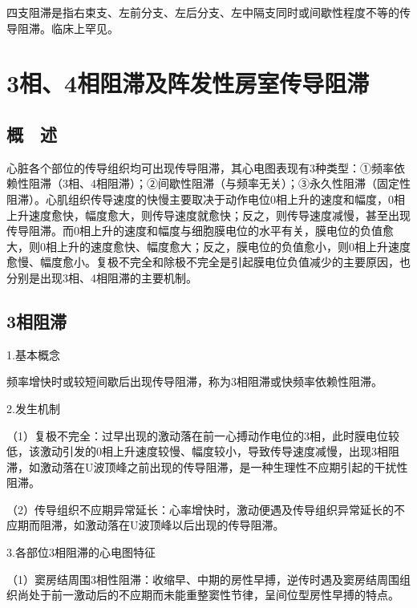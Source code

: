 四支阻滞是指右束支、左前分支、左后分支、左中隔支同时或间歇性程度不等的传导阻滞。临床上罕见。

\protect\hypertarget{text00029.html}{}{}

\protect\hypertarget{text00029.htmlux5cux23chapter29}{}{}

\chapter{3相、4相阻滞及阵发性房室传导阻滞}

\protect\hypertarget{text00029.htmlux5cux23subid355}{}{}

\section{概　述}

心脏各个部位的传导组织均可出现传导阻滞，其心电图表现有3种类型：①频率依赖性阻滞（3相、4相阻滞）；②间歇性阻滞（与频率无关）；③永久性阻滞（固定性阻滞）。心肌组织传导速度的快慢主要取决于动作电位0相上升的速度和幅度，0相上升速度愈快，幅度愈大，则传导速度就愈快；反之，则传导速度减慢，甚至出现传导阻滞。而0相上升的速度和幅度与细胞膜电位的水平有关，膜电位的负值愈大，则0相上升的速度愈快、幅度愈大；反之，膜电位的负值愈小，则0相上升速度愈慢、幅度愈小。复极不完全和除极不完全是引起膜电位负值减少的主要原因，也分别是出现3相、4相阻滞的主要机制。

\protect\hypertarget{text00029.htmlux5cux23subid356}{}{}

\section{3相阻滞}

1.基本概念

频率增快时或较短间歇后出现传导阻滞，称为3相阻滞或快频率依赖性阻滞。

2.发生机制

（1）复极不完全：过早出现的激动落在前一心搏动作电位的3相，此时膜电位较低，该激动引发的0相上升速度较慢、幅度较小，导致传导速度减慢，出现3相阻滞，如激动落在U波顶峰之前出现的传导阻滞，是一种生理性不应期引起的干扰性阻滞。

（2）传导组织不应期异常延长：心率增快时，激动便遇及传导组织异常延长的不应期而阻滞，如激动落在U波顶峰以后出现的传导阻滞。

3.各部位3相阻滞的心电图特征

（1）窦房结周围3相性阻滞：收缩早、中期的房性早搏，逆传时遇及窦房结周围组织尚处于前一激动后的不应期而未能重整窦性节律，呈间位型房性早搏的特点。

